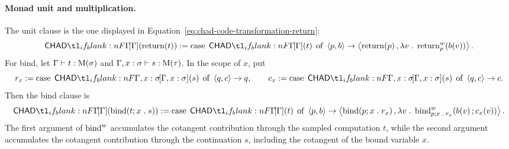 \documentclass[11pt,a4paper]{article}
\theoremstyle{definition}
\theoremstyle{remark}
\begin{document}
\paragraph{Monad unit and multiplication.}
The unit clause is the one displayed in Equation~\eqref{eq:chad-code-transformation-return}:
\begin{equation}
  \label{eq:appendix-chad-return}
  \Fun[np]{\chad[\Gamma]}{\fn[n]{\opn[b]{return}}{t}}
  :=
  \opn[b]{case}\;\Fun[np]{\chad[\Gamma]}{t}\;\opn[b]{of}\;\tuple{p,b}\to
  \tuple{
    \fn[n]{\opn[b]{return}}{p},
    \lambda v\; .\;
    \fn[n]{\opn[b]{return}^{w}_{p}}{\fn[n]{b}{v}}
  }.
\end{equation}
For bind, let \(\Gamma\vdash t:\Fun[nn]{\opn[b]{M}}{\sigma}\) and
\(\Gamma,x:\sigma\vdash s:\Fun[nn]{\opn[b]{M}}{\tau}\).  In the scope of
\(x\), put
\[
  r_{x}
  :=
  \opn[b]{case}\;\Fun[np]{\chad[\Gamma,x:\sigma]}{s}\;\opn[b]{of}\;\tuple{q,c}\to q,
  \qquad
  c_{x}
  :=
  \opn[b]{case}\;\Fun[np]{\chad[\Gamma,x:\sigma]}{s}\;\opn[b]{of}\;\tuple{q,c}\to c.
\]
Then the bind clause is
\begin{equation}
  \label{eq:appendix-chad-bind}
  \Fun[np]{\chad[\Gamma]}{\fn[n]{\opn[b]{bind}}{t; x\; .\; s}}
  :=
  \opn[b]{case}\;\Fun[np]{\chad[\Gamma]}{t}\;\opn[b]{of}\;\tuple{p,b}\to
  \tuple{
    \fn[n]{\opn[b]{bind}}{p; x\; .\; r_{x}},
    \lambda v\; .\;
    \fn[n]{\opn[b]{bind}^{w}_{p; x\; .\; r_{x}}}{
      \fn[n]{b}{v};
      \fn[n]{c_{x}}{v}
    }
  }.
\end{equation}
The first argument of \(\opn[b]{bind}^{w}\) accumulates the cotangent contribution
through the sampled computation \(t\), while the second argument accumulates the
cotangent contribution through the continuation \(s\), including the cotangent of
the bound variable \(x\).
\end{document}
